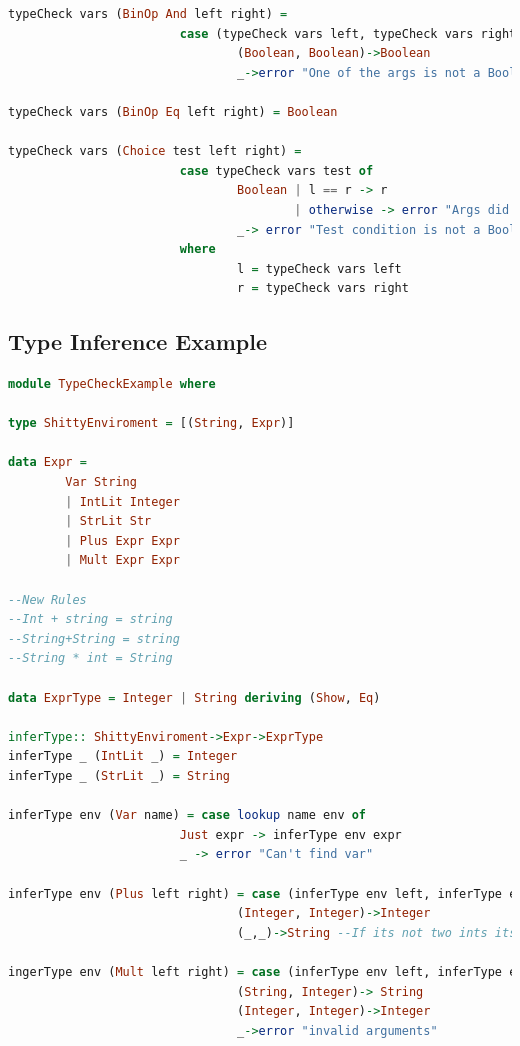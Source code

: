 \documentclass{article}
\begin{document}
\begin{lstlisting}[language=Haskell]
typeCheck vars (BinOp And left right) = 
                        case (typeCheck vars left, typeCheck vars right) of
                                (Boolean, Boolean)->Boolean
                                _->error "One of the args is not a Boolean"

typeCheck vars (BinOp Eq left right) = Boolean

typeCheck vars (Choice test left right) = 
                        case typeCheck vars test of
                                Boolean | l == r -> r
                                        | otherwise -> error "Args did not match"
                                _-> error "Test condition is not a Boolean"
                        where
                                l = typeCheck vars left
                                r = typeCheck vars right
    \end{lstlisting}
    \subsection{Type Inference Example}
    \begin{lstlisting}[language=Haskell]
module TypeCheckExample where

type ShittyEnviroment = [(String, Expr)]

data Expr = 
        Var String
        | IntLit Integer
        | StrLit Str
        | Plus Expr Expr
        | Mult Expr Expr

--New Rules
--Int + string = string
--String+String = string
--String * int = String

data ExprType = Integer | String deriving (Show, Eq)

inferType:: ShittyEnviroment->Expr->ExprType
inferType _ (IntLit _) = Integer
inferType _ (StrLit _) = String

inferType env (Var name) = case lookup name env of
                        Just expr -> inferType env expr
                        _ -> error "Can't find var"

inferType env (Plus left right) = case (inferType env left, inferType env right) of
                                (Integer, Integer)->Integer
                                (_,_)->String --If its not two ints its a string!

ingerType env (Mult left right) = case (inferType env left, inferType env right) of
                                (String, Integer)-> String
                                (Integer, Integer)->Integer
                                _->error "invalid arguments"
    \end{lstlisting}
\end{document}
